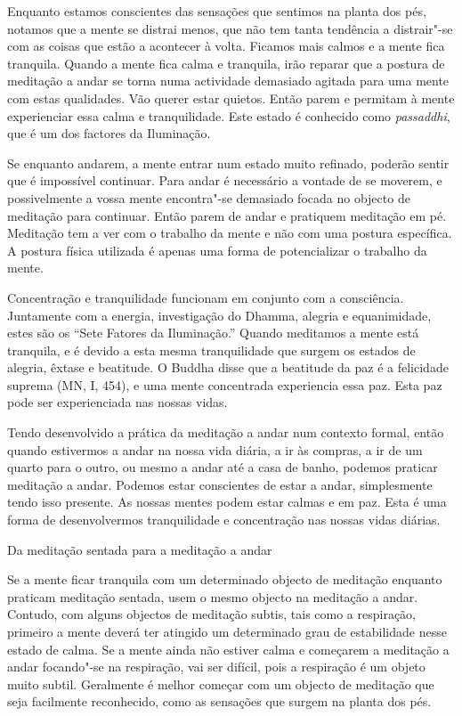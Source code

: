 Enquanto estamos conscientes das sensações que sentimos na planta dos
pés, notamos que a mente se distrai menos, que não tem tanta tendência a
distrair"-se com as coisas que estão a acontecer à volta. Ficamos mais
calmos e a mente fica tranquila. Quando a mente fica calma e tranquila,
irão reparar que a postura de meditação a andar se torna numa actividade
demasiado agitada para uma mente com estas qualidades. Vão querer estar
quietos. Então parem e permitam à mente experienciar essa calma e
tranquilidade. Este estado é conhecido como \emph{passaddhi}, que é um
dos factores da Iluminação.

Se enquanto andarem, a mente entrar num estado muito refinado, poderão
sentir que é impossível continuar. Para andar é necessário a vontade de
se moverem, e possivelmente a vossa mente encontra"-se demasiado focada
no objecto de meditação para continuar. Então parem de andar e pratiquem
meditação em pé. Meditação tem a ver com o trabalho da mente e não com
uma postura específica. A postura física utilizada é apenas uma forma de
potencializar o trabalho da mente.

Concentração e tranquilidade funcionam em conjunto com a consciência.
Juntamente com a energia, investigação do Dhamma, alegria e
equanimidade, estes são os ``Sete Fatores da Iluminação.'' Quando
meditamos a mente está tranquila, e é devido a esta mesma
tranquilidade que surgem os estados de alegria, êxtase e beatitude. O
Buddha disse que a beatitude da paz é a felicidade suprema (MN, I, 454),
e uma mente concentrada experiencia essa paz. Esta paz pode ser
experienciada nas nossas vidas.

Tendo desenvolvido a prática da meditação a andar num contexto formal,
então quando estivermos a andar na nossa vida diária, a ir às compras, a
ir de um quarto para o outro, ou mesmo a andar até a casa de banho,
podemos praticar meditação a andar. Podemos estar conscientes de estar a
andar, simplesmente tendo isso presente. As nossas mentes podem estar
calmas e em paz. Esta é uma forma de desenvolvermos tranquilidade e
concentração nas nossas vidas diárias.

\begin{siderule-quote}
  Da meditação sentada para a meditação a andar
\end{siderule-quote}

Se a mente ficar tranquila com um determinado objecto de meditação
enquanto praticam meditação sentada, usem o mesmo objecto na meditação a
andar. Contudo, com alguns objectos de meditação subtis, tais como a
respiração, primeiro a mente deverá ter atingido um determinado grau de
estabilidade nesse estado de calma. Se a mente ainda não estiver calma e
começarem a meditação a andar focando"-se na respiração, vai ser difícil,
pois a respiração é um objeto muito subtil. Geralmente é melhor começar
com um objecto de meditação que seja facilmente reconhecido, como as
sensações que surgem na planta dos pés.

